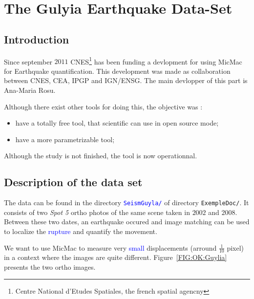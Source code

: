 


\section{The Gulyia Earthquake Data-Set}


\subsection{Introduction}

Since september $2011$ CNES\footnote{Centre National d'Etudes Spatiales, the french spatial agencny}
has been funding a devlopment for using MicMac for  Earthquake quantification. This development
was made as collaboration between CNES, CEA, IPGP and IGN/ENSG. The main devlopper of this part
is Ana-Maria Rosu.

Although there exist other tools for doing this, the objective was :

\begin{itemize}
   \item have a totally free tool, that scientific can use in open source mode;
   \item have a more parametrizable tool;
\end{itemize}

Although the study is not finished, the tool  is now operationnal.


\subsection{Description of the data set}

The data can be found in the directory {\tt \textcolor{blue}{SeismGuyla/}} %
 of directory {\tt ExempleDoc/}. %
It consists of  two \emph{Spot 5} ortho photos of the same scene taken in $2002$ and
$2008$. Between these two dates, an earthquake occured and image matching can be used to
localize the \textcolor{blue}{rupture} and quantify the movement.

We want to use MicMac to measure very \textcolor{blue}{small} displacements (arround $\frac{1}{10}$ pixel) in
a context where the images are quite different. Figure~\ref{FIG:OK:Guylia} presents the two
ortho images.

